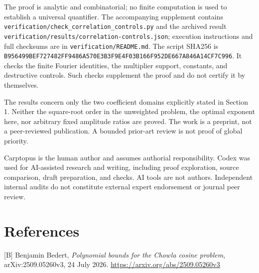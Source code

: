\documentclass[11pt]{article}
\begin{document}
The proof is analytic and combinatorial; no finite computation is used to establish a universal quantifier. The accompanying supplement contains \nolinkurl{verification/check_correlation_controls.py} and the archived result \nolinkurl{verification/results/correlation-controls.json}; execution instructions and full checksums are in \nolinkurl{verification/README.md}. The script SHA256 is \texttt{B\allowbreak{}9\allowbreak{}5\allowbreak{}6\allowbreak{}4\allowbreak{}9\allowbreak{}9\allowbreak{}B\allowbreak{}E\allowbreak{}F\allowbreak{}7\allowbreak{}2\allowbreak{}7\allowbreak{}4\allowbreak{}8\allowbreak{}2\allowbreak{}F\allowbreak{}F\allowbreak{}9\allowbreak{}4\allowbreak{}8\allowbreak{}6\allowbreak{}A\allowbreak{}5\allowbreak{}7\allowbreak{}0\allowbreak{}E\allowbreak{}3\allowbreak{}B\allowbreak{}3\allowbreak{}F\allowbreak{}9\allowbreak{}E\allowbreak{}4\allowbreak{}F\allowbreak{}0\allowbreak{}3\allowbreak{}B\allowbreak{}1\allowbreak{}6\allowbreak{}6\allowbreak{}F\allowbreak{}9\allowbreak{}5\allowbreak{}2\allowbreak{}D\allowbreak{}E\allowbreak{}6\allowbreak{}6\allowbreak{}7\allowbreak{}A\allowbreak{}8\allowbreak{}4\allowbreak{}6\allowbreak{}A\allowbreak{}1\allowbreak{}4\allowbreak{}C\allowbreak{}F\allowbreak{}7\allowbreak{}C\allowbreak{}9\allowbreak{}9\allowbreak{}6}. It checks the finite Fourier identities, the multiplier support, constants, and destructive controls. Such checks supplement the proof and do not certify it by themselves.

The results concern only the two coefficient domains explicitly stated in Section 1. Neither the square-root order in the unweighted problem, the optimal exponent here, nor arbitrary fixed amplitude ratios are proved. The work is a preprint, not a peer-reviewed publication. A bounded prior-art review is not proof of global priority.

Carptopus is the human author and assumes authorial responsibility. Codex was used for AI-assisted research and writing, including proof exploration, source comparison, draft preparation, and checks. AI tools are not authors. Independent internal audits do not constitute external expert endorsement or journal peer review.

\section*{References}
\small\raggedright\setlength{\parskip}{0.3em}

[B] Benjamin Bedert, \emph{Polynomial bounds for the Chowla cosine problem}, arXiv:2509.05260v3, 24 July 2026. \url{https://arxiv.org/abs/2509.05260v3}
\end{document}
